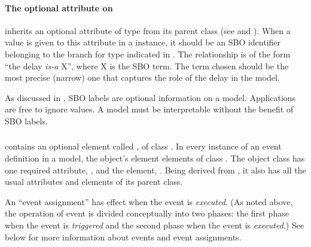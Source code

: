 \label{sec:delay-id}



\paragraph{The optional  attribute on }
\label{sec:delay-sboterm}

\Delay inherits an optional  attribute of type
 from its parent class \SBase (see
 and ).  When a
value is given to this attribute in a \Delay instance, it should
be an SBO identifier belonging to the branch for type \Delay
indicated in .  The
relationship is of the form ``the delay \emph{is-a} X'', where X
is the SBO term.  The term chosen should be the most precise
(narrow) one that captures the role of the delay in the model.

As discussed in , SBO labels are optional
information on a model.  Applications are free to ignore
 values.  A model must be interpretable without the
benefit of SBO labels.


\subsubsection{}
\label{sec:eventassignment}
\label{sec:listofeventassignments}

\Event contains an optional element called
, of class \ListOfEventAssignments.
In every instance of an event definition in a model, the object's
 element   elements of class
\EventAssignment.  The object class \EventAssignment has one
required attribute, , and the element,
.  Being derived from \SBase, it also has all the
usual attributes and elements of its parent class.

An ``event assignment'' has effect when the event is
\emph{executed}.  (As noted above, the operation of event is
divided conceptually into two phases: the first phase when the
event is \emph{triggered} and the second phase when the event is
\emph{executed}.)  See  below for
more information about events and event assignments.


